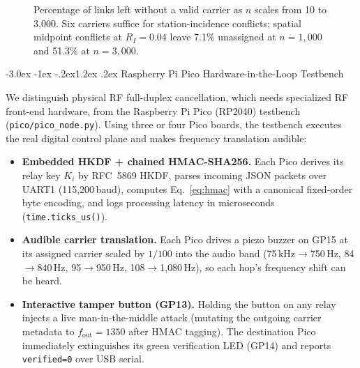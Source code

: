 \documentclass[10pt,a4paper]{article}
\makeatletter
\renewcommand\section{\@startsection{section}{1}{\z@}%
  {-3.0ex \@plus -1ex \@minus -.2ex}{1.2ex \@plus .2ex}%
  {\normalfont\large\bfseries}}
\newcommand\kHz{\,kHz}
\makeatother
\begin{document}
\begin{figure}[!htb]
\centering
{}
\caption{Percentage of links left without a valid carrier as $n$ scales from 10 to 3{,}000. Six carriers suffice for
station-incidence conflicts; spatial midpoint conflicts at $R_I=0.04$ leave 7.1\% unassigned at $n=1{,}000$ and 51.3\% at
$n=3{,}000$.}
\label{fig:carriers}
\end{figure}

\section{Raspberry Pi Pico Hardware-in-the-Loop Testbench}\label{sec:hw}

We distinguish physical RF full-duplex cancellation, which needs specialized RF front-end hardware, from the Raspberry Pi Pico
(RP2040) testbench (\texttt{pico/pico\_node.py}). Using three or four Pico boards, the testbench executes the real digital control
plane and makes frequency translation audible:
\begin{itemize}\setlength\itemsep{1pt}
  \item \textbf{Embedded HKDF + chained HMAC-SHA256.} Each Pico derives its relay key $K_i$ by RFC~5869 HKDF, parses incoming JSON
        packets over UART1 (115{,}200\,baud), computes Eq.~\eqref{eq:hmac} with a canonical fixed-order byte encoding, and logs
        processing latency in microseconds (\texttt{time.ticks\_us()}).
  \item \textbf{Audible carrier translation.} Each Pico drives a piezo buzzer on GP15 at its assigned carrier scaled by $1/100$ into
        the audio band (75\kHz$\to$750\,Hz, 84$\to$840\,Hz, 95$\to$950\,Hz, 108$\to$1{,}080\,Hz), so each hop's frequency shift can be heard.
  \item \textbf{Interactive tamper button (GP13).} Holding the button on any relay injects a live man-in-the-middle attack (mutating
        the outgoing carrier metadata to $f_\text{out}=1350$ after HMAC tagging). The destination Pico immediately extinguishes its
        green verification LED (GP14) and reports \texttt{verified=0} over USB serial.
\end{itemize}
\end{document}
